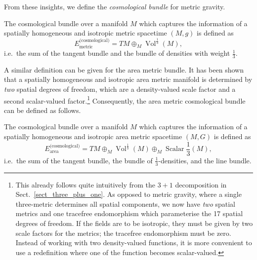 From these insights, we define the \emph{cosmological bundle} for metric gravity.
\begin{definition}
  The cosmological bundle over a manifold $M$ which captures the information of a spatially homogeneous and isotropic metric spacetime $(M,g)$ is defined as
  \begin{equation}
    E_\text{metric}^\text{(cosmological)} = TM \oplus_M \operatorname{Vol}^{\frac{1}{3}}(M),
  \end{equation}
  i.e.\ the sum of the tangent bundle and the bundle of densities with weight $\frac{1}{3}$.
\end{definition}
A similar definition can be given for the area metric bundle. It has been shown \cite{Duell_2020} that a spatially homogeneous and isotropic area metric manifold is determined by \emph{two} spatial degrees of freedom, which are a density-valued scale factor and a second scalar-valued factor.\footnote{This already follows quite intuitively from the $3+1$ decomposition in Sect.~\ref{sect_three_plus_one}. As opposed to metric gravity, where a single three-metric determines all spatial components, we now have \emph{two} spatial metrics and one tracefree endomorphism which parameterise the 17 spatial degrees of freedom. If the fields are to be isotropic, they must be given by two scale factors for the metrics; the tracefree endomorphism must be zero. Instead of working with two density-valued functions, it is more convenient to use a redefinition where one of the function becomes scalar-valued.} Consequently, the area metric cosmological bundle can be defined as follows.
\begin{definition}
  The cosmological bundle over a manifold $M$ which captures the information of a spatially homogeneous and isotropic area metric spacetime $(M,G)$ is defined as
  \begin{equation}
    E_\text{area}^\text{(cosmological)} = TM \oplus_M \operatorname{Vol}^{\frac{1}{3}}(M) \oplus_M \operatorname{Scalar}{\frac{1}{3}}(M),
  \end{equation}
  i.e.\ the sum of the tangent bundle, the bundle of $\frac{1}{3}$-densities, and the line bundle.
\end{definition}

